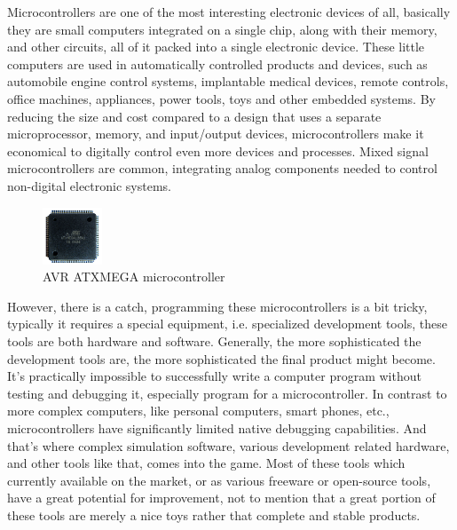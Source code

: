 \documentclass[a4paper,twoside,15pt]{book}
\begin{document}
        Microcontrollers are one of the most interesting electronic devices of all, basically they are small computers integrated on a single chip, along with their memory, and other circuits, all of it packed into a single electronic device. These little computers are used in automatically controlled products and devices, such as automobile engine control systems, implantable medical devices, remote controls, office machines, appliances, power tools, toys and other embedded systems. By reducing the size and cost compared to a design that uses a separate microprocessor, memory, and input/output devices, microcontrollers make it economical to digitally control even more devices and processes. Mixed signal microcontrollers are common, integrating analog components needed to control non-digital electronic systems.

        \begin{figure}
            \centering{}
            \includegraphics[width=50pt]{images/AVR_ATXMEGA_128A1.jpeg}
            \caption{AVR ATXMEGA microcontroller}
        \end{figure}
        However, there is a catch, programming these microcontrollers is a bit tricky, typically it requires a special equipment, i.e. specialized development tools, these tools are both hardware and software. Generally, the more sophisticated the development tools are, the more sophisticated the final product might become. It's practically impossible to successfully write a computer program without testing and debugging it, especially program for a microcontroller. In contrast to more complex computers, like personal computers, smart phones, etc., microcontrollers have significantly limited native debugging capabilities. And that's where complex simulation software, various development related hardware, and other tools like that, comes into the game. Most of these tools which currently available on the market, or as various freeware or open-source tools, have a great potential for improvement, not to mention that a great portion of these tools are merely a nice toys rather that complete and stable products.
\end{document}
